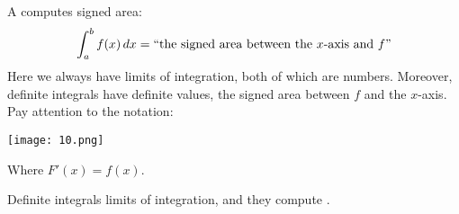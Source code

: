\documentclass{ximera}
\begin{document}
A  computes signed area:
\[
\int_a^b f(x) \mathop{}\!d x = \text{``the signed area between the $x$-axis and $f$''}
\]
Here we always have limits of integration, both of which are
numbers. Moreover, definite integrals have definite values, the signed
area between $f$ and the $x$-axis. Pay attention to the notation:
\begin{image}
  \texttt{[image: 10.png]}
\end{image}
Where $F'(x) = f(x)$.
\begin{explanation}%
  Definite integrals  limits of integration, and they compute
  .
\end{explanation}
\end{document}
